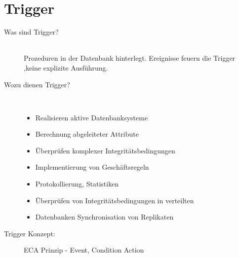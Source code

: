 \documentclass[a4paper,10pt,titlepage=false]{scrreprt}
\begin{document}
\chapter{Trigger} %
\label{cha:trigger}
\begin{description}
  \item[Was sind Trigger?] \hfill \\
  Prozeduren in der Datenbank hinterlegt. Ereignisse feuern die Trigger ,keine explizite Ausführung.
  \item[Wozu dienen Trigger?] \hfill \\
  \begin{itemize}
    \item Realisieren aktive Datenbanksysteme
\item Berechnung abgeleiteter Attribute
\item Überprüfen komplexer Integritätsbedingungen
\item Implementierung von Geschäftsregeln
\item Protokollierung, Statistiken
\item Überprüfen von Integritätsbedingungen in verteilten
\item Datenbanken Synchronisation von Replikaten
  \end{itemize}
 \item[Trigger Konzept:] ECA Prinzip - Event, Condition Action
\end{description}
\end{document}
